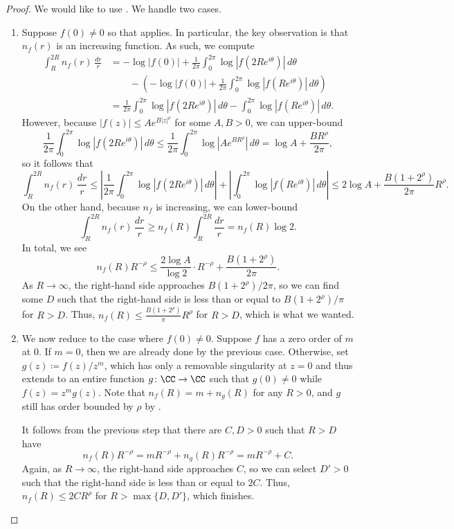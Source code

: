 \documentclass[notes.tex]{subfiles}
\begin{document}
\begin{proof}
	We would like to use . We handle two cases.
	\begin{enumerate}
		\item Suppose $f(0)\ne0$ so that  applies. In particular, the key observation is that $n_f(r)$ is an increasing function. As such, we compute
		\begin{align*}
			\int_R^{2R}n_f(r)\,\frac{dr}r &= -\log|f(0)|+\frac1{2\pi}\int_0^{2\pi}\log\left|f\left(2Re^{i\theta}\right)\right|\,d\theta \\
			&\qquad-\left(-\log|f(0)|+\frac1{2\pi}\int_0^{2\pi}\log\left|f\left(Re^{i\theta}\right)\right|\,d\theta\right) \\
			&= \frac1{2\pi}\int_0^{2\pi}\log\left|f\left(2Re^{i\theta}\right)\right|\,d\theta-\int_0^{2\pi}\log\left|f\left(Re^{i\theta}\right)\right|\,d\theta.
		\end{align*}
		However, because $|f(z)|\le Ae^{B|z|^\rho}$ for some $A,B>0$, we can upper-bound
		\[\frac1{2\pi}\int_0^{2\pi}\log\left|f\left(2Re^{i\theta}\right)\right|\,d\theta\le\frac1{2\pi}\int_0^{2\pi}\log\left|Ae^{BR^\rho}\right|\,d\theta=\log A+\frac{BR^\rho}{2\pi},\]
		so it follows that
		\[\int_R^{2R}n_f(r)\,\frac{dr}r\le\left|\frac1{2\pi}\int_0^{2\pi}\log\left|f\left(2Re^{i\theta}\right)\right|\,d\theta\right|+\left|\int_0^{2\pi}\log\left|f\left(Re^{i\theta}\right)\right|\,d\theta\right|\le2\log A+\frac {B\left(1+2^\rho\right)}{2\pi}R^\rho.\]
		On the other hand, because $n_f$ is increasing, we can lower-bound
		\[\int_R^{2R}n_f(r)\,\frac{dr}r\ge n_f(R)\int_R^{2R}\frac{dr}r=n_f(R)\log2.\]
		In total, we see
		\[n_f(R)R^{-\rho}\le\frac{2\log A}{\log 2}\cdot R^{-\rho}+\frac{B\left(1+2^\rho\right)}{2\pi}.\]
		As $R\to\infty$, the right-hand side approaches $B\left(1+2^\rho\right)/2\pi$, so we can find some $D$ such that the right-hand side is less than or equal to $B\left(1+2^\rho\right)/\pi$ for $R>D$. Thus, $n_f(R)\le\frac{B\left(1+2^\rho\right)}{\pi}R^\rho$ for $R>D$, which is what we wanted.

		\item We now reduce to the case where $f(0)\ne0$. Suppose $f$ has a zero order of $m$ at $0$. If $m=0$, then we are already done by the previous case. Otherwise, set $g(z)\coloneqq f(z)/z^m$, which has only a removable singularity at $z=0$ and thus extends to an entire function $g\colon\CC\to\CC$ such that $g(0)\ne0$ while $f(z)=z^mg(z)$. Note that $n_f(R)=m+n_g(R)$ for any $R>0$, and $g$ still has order bounded by $\rho$ by .

		It follows from the previous step that there are $C,D>0$ such that $R>D$ have
		\[n_f(R)R^{-\rho}=mR^{-\rho}+n_g(R)R^{-\rho}=mR^{-\rho}+C.\]
		Again, as $R\to\infty$, the right-hand side approaches $C$, so we can select $D'>0$ such that the right-hand side is less than or equal to $2C$. Thus, $n_f(R)\le2CR^\rho$ for $R>\max\{D,D'\}$, which finishes.
		\qedhere
	\end{enumerate}
\end{proof}
\end{document}
